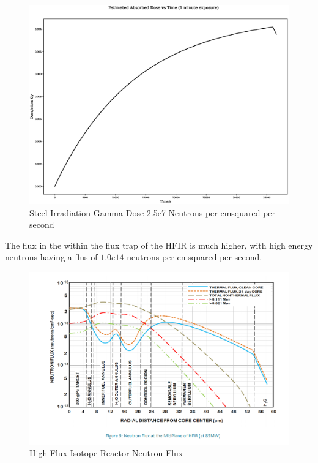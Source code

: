 \begin{figure}
  \begin{center}
    \includegraphics[width=15.0cm]{chapters/background_radiation_effects_and_transport/neutron_plots/1/gamma_dose.eps}
    \caption{Steel Irradiation Gamma Dose 2.5e7 Neutrons per cmsquared per second}
    \label{fig:ga_vs_sim_512_2}
  \end{center}
\end{figure}

The flux in the within the flux trap of the HFIR is much higher, with high energy neutrons having a flus of $1.0e14$ neutrons per cmsquared per second.  

\begin{figure}
  \begin{center}
    \includegraphics[width=15.0cm]{chapters/background_radiation_effects_and_transport/images/HFIR_neutron_spectra_guide.png}
    \caption{High Flux Isotope Reactor Neutron Flux}
    \label{fig:ga_vs_sim_512_2}
  \end{center}
\end{figure}

